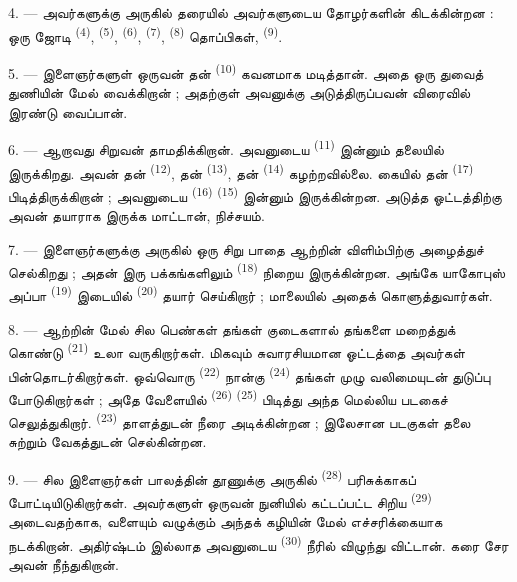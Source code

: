 4. --- அவர்களுக்கு அருகில் தரையில் அவர்களுடைய தோழர்களின் 
கிடக்கின்றன : ஒரு ஜோடி  \textsuperscript{(4)},
 \textsuperscript{(5)}, 
\textsuperscript{(6)},  \textsuperscript{(7)},
 \textsuperscript{(8)} தொப்பிகள், 
\textsuperscript{(9)}.

5. --- இளைஞர்களுள் ஒருவன் தன்  \textsuperscript{(10)}
கவனமாக மடித்தான். அதை ஒரு துவைத் துணியின் மேல் வைக்கிறான் ; அதற்குள்
அவனுக்கு அடுத்திருப்பவன் விரைவில் இரண்டு  வைப்பான்.

6. --- ஆறாவது சிறுவன் தாமதிக்கிறான். அவனுடைய 
\textsuperscript{(11)} இன்னும் தலையில் இருக்கிறது. அவன் தன் 
\textsuperscript{(12)}, தன்  \textsuperscript{(13)},
தன்  \textsuperscript{(14)} கழற்றவில்லை. கையில் தன்
 \textsuperscript{(17)} பிடித்திருக்கிறான் ; அவனுடைய
 \textsuperscript{(16)} 
\textsuperscript{(15)} இன்னும் இருக்கின்றன. அடுத்த ஓட்டத்திற்கு அவன்
தயாராக இருக்க மாட்டான், நிச்சயம்.

7. --- இளைஞர்களுக்கு அருகில் ஒரு சிறு பாதை ஆற்றின் விளிம்பிற்கு
அழைத்துச் செல்கிறது ; அதன் இரு பக்கங்களிலும் 
\textsuperscript{(18)} நிறைய இருக்கின்றன. அங்கே யாகோபுஸ் அப்பா
 \textsuperscript{(19)} இடையில் 
\textsuperscript{(20)} தயார் செய்கிறார் ; மாலையில் அதைக் கொளுத்துவார்கள்.

\VUsaut{4.4mm}
\VUsaut{3.4mm}

8. --- ஆற்றின் மேல் சில பெண்கள் தங்கள் குடைகளால் தங்களை மறைத்துக் கொண்டு
 \textsuperscript{(21)} உலா வருகிறார்கள். மிகவும் சுவாரசியமான
ஓட்டத்தை அவர்கள் பின்தொடர்கிறார்கள். ஒவ்வொரு 
\textsuperscript{(22)} நான்கு  \textsuperscript{(24)}
தங்கள் முழு வலிமையுடன் துடுப்பு போடுகிறார்கள் ; அதே வேளையில்
 \textsuperscript{(26)} 
\textsuperscript{(25)} பிடித்து அந்த மெல்லிய படகைச் செலுத்துகிறார்.
 \textsuperscript{(23)} தாளத்துடன் நீரை அடிக்கின்றன ;
இலேசான படகுகள் தலை சுற்றும் வேகத்துடன் செல்கின்றன.

9. --- சில இளைஞர்கள் பாலத்தின் தூணுக்கு அருகில் 
\textsuperscript{(28)} பரிசுக்காகப் போட்டியிடுகிறார்கள். அவர்களுள் ஒருவன்
நுனியில் கட்டப்பட்ட சிறிய  \textsuperscript{(29)} அடைவதற்காக,
வளையும் வழுக்கும் அந்தக் கழியின் மேல் எச்சரிக்கையாக நடக்கிறான். அதிர்ஷ்டம்
இல்லாத அவனுடைய  \textsuperscript{(30)} நீரில் விழுந்து
விட்டான். கரை சேர அவன் நீந்துகிறான்.


